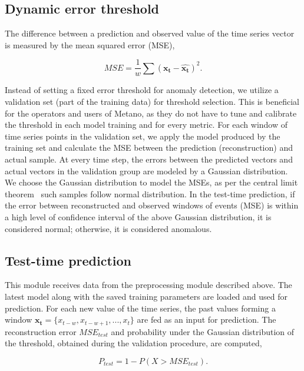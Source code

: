 \subsection{Dynamic error threshold}\label{ch:metrics:sec:metano:subsec:threshold}
The difference between a prediction and observed value of the time series vector is measured by the mean squared error (MSE),

\begin{equation}\label{eqMSE}
MSE=\frac{1}{w}\sum(\mathbf{x_t}-\mathbf{\hat{x_t}})^2.
\end{equation}

Instead of setting a fixed error threshold for anomaly detection, we utilize a validation set (part of the training data) for threshold selection. This is beneficial for the operators and users of Metano, as they do not have to tune and calibrate the threshold in each model training and for every metric. For each window of time series points in the validation set, we apply the model produced by the training set and calculate the MSE between the prediction (reconstruction) and actual sample. At every time step, the errors between the predicted vectors and actual vectors in the validation group are modeled by a Gaussian distribution. We choose the Gaussian distribution to model the MSEs, as per the central limit theorem~\cite{rosenblatt1956central} such samples follow normal distribution.
In the test-time prediction, if the error between reconstructed and observed windows of events (MSE) is within a high level of confidence interval of the above Gaussian distribution, it is considered normal; otherwise, it is considered anomalous.

\subsection{Test-time prediction}
\label{realtimedetectionunstablebehavior}
This module receives data from the preprocessing module described above. The latest model along with the saved training parameters are loaded and used for prediction. For each new value of the time series, the past values forming a window $\mathbf{x_t} = \{x_{t-w}, x_{t-w+1}, ..., x_t\}$ are fed as an input for prediction. The reconstruction error $MSE_{test}$ and probability under the Gaussian distribution of the threshold, obtained during the validation procedure, are computed,

\begin{equation}\label{eqP}
P_{test} = 1 - P(X > MSE_{test}).
\end{equation}


